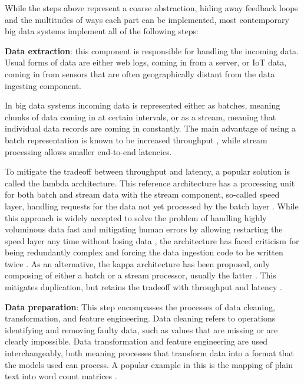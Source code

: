 While the steps above represent a coarse abstraction, hiding away feedback loops and the multitudes of ways each part can be implemented, most contemporary big data systems implement all of the following steps:

\textbf{Data extraction}: this component is responsible for handling the incoming data. Usual forms of data are either web logs, coming in from a server, or IoT data, coming in from sensors that are often geographically distant from the data ingesting component.

In big data systems incoming data is represented either as batches, meaning chunks of data coming in at certain intervals, or as a stream, meaning that individual data records are coming in constantly. The main advantage of using a batch representation is known to be increased throughput%
, while stream processing allows smaller end-to-end latencies. %

To mitigate the tradeoff between throughput and latency, a popular solution is called the lambda architecture. This reference architecture has a processing unit for both batch and stream data with the stream component, so-called speed layer, handling requests for the data not yet processed by the batch layer \cite{beatingcap}. While this approach is widely accepted to solve the problem of handling highly voluminous data fast and mitigating human errors by allowing restarting the speed layer any time without losing data \cite{lambdakappa}, the architecture has faced criticism for being redundantly complex and forcing the data ingestion code to be written twice \cite{questioninglambda} \cite{uber} \cite{facebook}. As an alternative, the kappa architecture has been proposed, only composing of either a batch or a stream processor, usually the latter \cite{questioninglambda}. This mitigates duplication, but retains the tradeoff with throughput and latency \cite{lambdakappa}.

\textbf{Data preparation}: This step encompasses the processes of data cleaning, transformation, and feature engineering. Data cleaning refers to operations identifying and removing faulty data, such as values that are missing or are clearly impossible. Data transformation and feature engineering are used interchangeably, both meaning processes that transform data into a format that the models used can process. A popular example in this is the mapping of plain text into word count matrices \cite{dapbook}.

